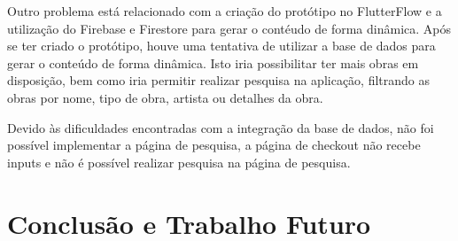 \documentclass[conference]{IEEEtran}
\begin{document}
Outro problema está relacionado com a criação do protótipo no FlutterFlow 
e a utilização do Firebase e Firestore para gerar o contéudo de forma dinâmica. 
Após se ter criado o protótipo, houve uma tentativa de utilizar a base de dados para 
gerar o conteúdo de forma dinâmica. Isto iria possibilitar ter mais obras em disposição, 
bem como iria permitir realizar pesquisa na aplicação, filtrando as obras por nome, 
tipo de obra, artista ou detalhes da obra.

Devido às dificuldades encontradas com a integração da base de dados, 
não foi possível implementar a página de pesquisa, a página de checkout não 
recebe inputs e não é possível realizar pesquisa na página de pesquisa.


\section{Conclusão e Trabalho Futuro}



\end{document}
